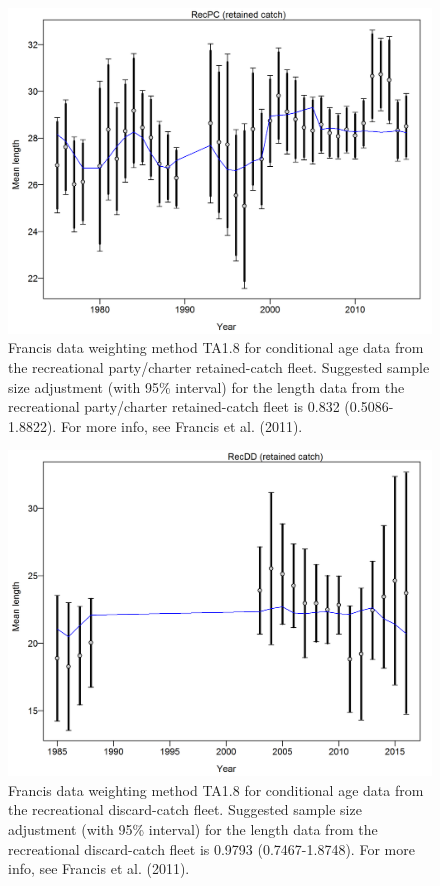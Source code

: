 \documentclass[12pt,]{article}
\begin{document}
\begin{figure}[htbp]
\centering
\includegraphics{r4ss/plots_mod1/comp_lendat_data_weighting_TA1.8_RecPC.png}
\caption{Francis data weighting method TA1.8 for conditional age data
from the recreational party/charter retained-catch fleet. Suggested
sample size adjustment (with 95\% interval) for the length data from the
recreational party/charter retained-catch fleet is 0.832
(0.5086-1.8822). For more info, see Francis et al. (2011).
\label{fig:comp_lendat_data_weighting_TA1.8_RecPC}}
\end{figure}

\begin{figure}[htbp]
\centering
\includegraphics{r4ss/plots_mod1/comp_lendat_data_weighting_TA1.8_RecDD.png}
\caption{Francis data weighting method TA1.8 for conditional age data
from the recreational discard-catch fleet. Suggested sample size
adjustment (with 95\% interval) for the length data from the
recreational discard-catch fleet is 0.9793 (0.7467-1.8748). For more
info, see Francis et al. (2011).
\label{fig:comp_lendat_data_weighting_TA1.8_RecDD}}
\end{figure}
\end{document}
